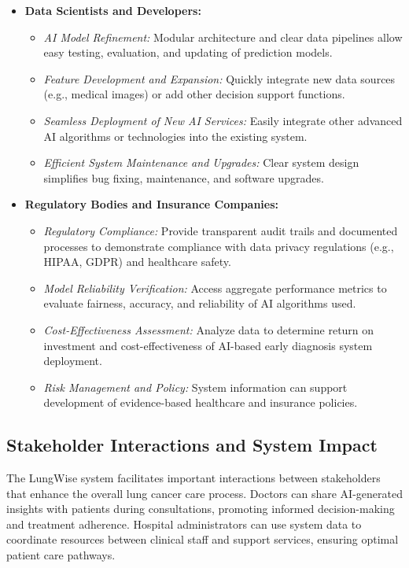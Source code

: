 \begin{itemize}
    \item \textbf{Data Scientists and Developers:}
    \begin{itemize}
        \item \textit{AI Model Refinement:} Modular architecture and clear data pipelines allow easy testing, evaluation, and updating of prediction models.
        \item \textit{Feature Development and Expansion:} Quickly integrate new data sources (e.g., medical images) or add other decision support functions.
        \item \textit{Seamless Deployment of New AI Services:} Easily integrate other advanced AI algorithms or technologies into the existing system.
        \item \textit{Efficient System Maintenance and Upgrades:} Clear system design simplifies bug fixing, maintenance, and software upgrades.
    \end{itemize}

    \item \textbf{Regulatory Bodies and Insurance Companies:}
    \begin{itemize}
        \item \textit{Regulatory Compliance:} Provide transparent audit trails and documented processes to demonstrate compliance with data privacy regulations (e.g., HIPAA, GDPR) and healthcare safety.
        \item \textit{Model Reliability Verification:} Access aggregate performance metrics to evaluate fairness, accuracy, and reliability of AI algorithms used.
        \item \textit{Cost-Effectiveness Assessment:} Analyze data to determine return on investment and cost-effectiveness of AI-based early diagnosis system deployment.
        \item \textit{Risk Management and Policy:} System information can support development of evidence-based healthcare and insurance policies.
    \end{itemize}
\end{itemize}

\subsection{Stakeholder Interactions and System Impact}

The LungWise system facilitates important interactions between stakeholders that enhance the overall lung cancer care process. Doctors can share AI-generated insights with patients during consultations, promoting informed decision-making and treatment adherence. Hospital administrators can use system data to coordinate resources between clinical staff and support services, ensuring optimal patient care pathways.

